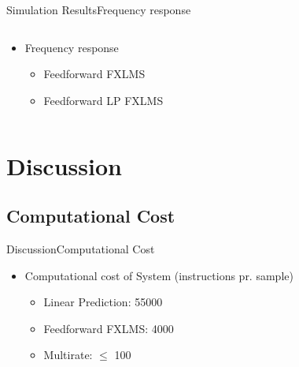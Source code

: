 \begin{frame}{Simulation Results}{Frequency response}		
\begin{columns}
	\begin{column}{0.4\textwidth}
		\begin{itemize}
			\item Frequency response
			\begin{itemize}
				\item Feedforward FXLMS 
				\item Feedforward LP FXLMS 
			\end{itemize}
		\end{itemize}
	\end{column}
	\begin{column}{0.6\textwidth} 
		\resizebox{0.9\columnwidth}{!}{		
			}
	\end{column}
\end{columns}
\end{frame}


\section{Discussion}
\subsection{Computational Cost}

\begin{frame}{Discussion}{Computational Cost}		
\begin{itemize}
\item Computational cost of System (instructions pr. sample)
	\begin{itemize}
		\item Linear Prediction: 55000 
		\item Feedforward FXLMS: 4000 
		\item Multirate: $\leq$ 100
	\end{itemize}
\end{itemize}

\end{frame}
